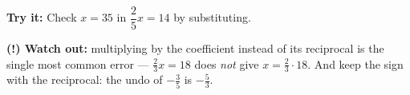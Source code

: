 \documentclass[12pt]{article}
\begin{document}
\begin{tryitbox}
\textbf{Try it:} Check $x = 35$ in $\dfrac{2}{5}x = 14$ by substituting.\\[2pt]
\end{tryitbox}

\begin{watchoutbox}
\textbf{(!) Watch out:} multiplying by the coefficient instead of its reciprocal
is the single most common error --- $\frac{2}{3}x = 18$ does \emph{not} give
$x = \frac{2}{3}\cdot 18$. And keep the sign with the reciprocal: the undo of
$-\frac{3}{5}$ is $-\frac{5}{3}$.
\end{watchoutbox}
\end{document}
